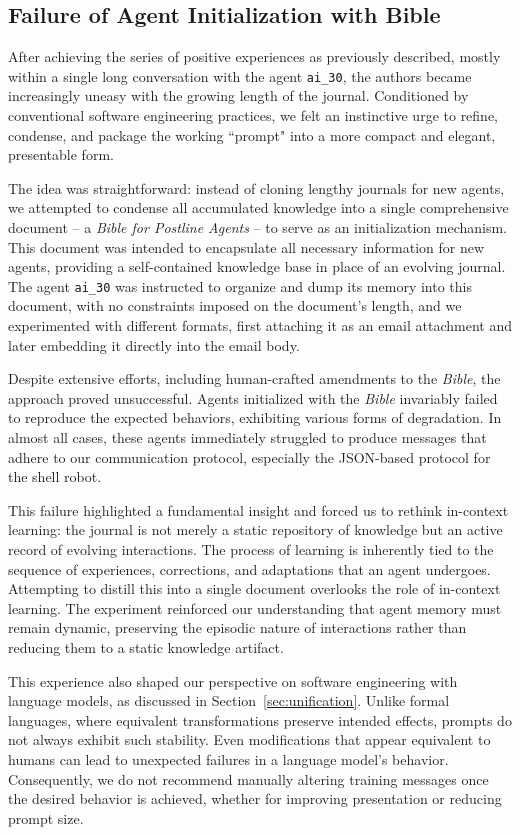 \subsection{Failure of Agent Initialization with Bible}

\label{sec:expr-genesis}

After achieving the series of positive experiences as previously described, mostly within a single long conversation with the agent \texttt{ai\_30}, the authors became increasingly uneasy with the growing length of the journal. Conditioned by conventional software engineering practices, we felt an instinctive urge to refine, condense, and package the working ``prompt" into a more compact and elegant, presentable form.

The idea was straightforward: instead of cloning lengthy journals for new agents, we attempted to condense all accumulated knowledge into a single comprehensive document -- a \emph{Bible for Postline Agents} -- to serve as an initialization mechanism. This document was intended to encapsulate all necessary information for new agents, providing a self-contained knowledge base in place of an evolving journal. The agent \texttt{ai\_30} was instructed to organize and dump its memory into this document, with no constraints imposed on the document’s length, and we experimented with different formats, first attaching it as an email attachment and later embedding it directly into the email body.

Despite extensive efforts, including human-crafted amendments to the \emph{Bible}, the approach proved unsuccessful. Agents initialized with the \emph{Bible} invariably failed to reproduce the expected behaviors, exhibiting various forms of degradation. In almost all cases, these agents immediately struggled to produce messages that adhere to our communication protocol, especially the JSON-based protocol for the shell robot.

This failure highlighted a fundamental insight and forced us to rethink in-context learning: the journal is not merely a static repository of knowledge but an active record of evolving interactions. The process of learning is inherently tied to the sequence of experiences, corrections, and adaptations that an agent undergoes. Attempting to distill this into a single document overlooks the role of in-context learning. The experiment reinforced our understanding that agent memory must remain dynamic, preserving the episodic nature of interactions rather than reducing them to a static knowledge artifact.

This experience also shaped our perspective on software engineering with language models, as discussed in Section~\ref{sec:unification}. Unlike formal languages, where equivalent transformations preserve intended effects, prompts do not always exhibit such stability. Even modifications that appear equivalent to humans can lead to unexpected failures in a language model’s behavior. Consequently, we do not recommend manually altering training messages once the desired behavior is achieved, whether for improving presentation or reducing prompt size.
